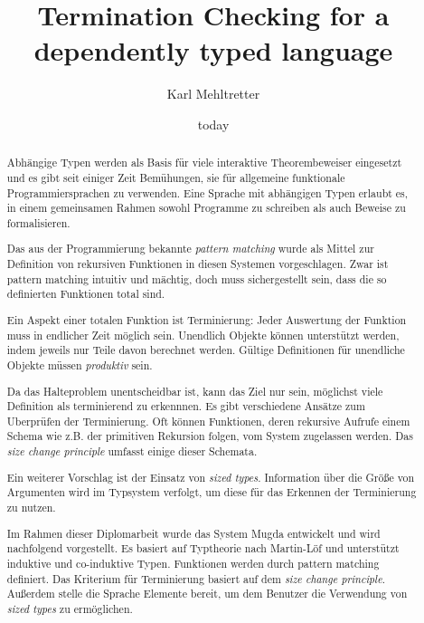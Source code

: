 \documentclass[a4paper,11pt]{report}
\theoremstyle{remark}
\newcommand{\mugda}{\textsf{Mugda }}
\begin{document}
\title{Termination Checking for a dependently typed language}
\author{Karl Mehltretter}
\date{today}
\renewcommand{\abstractname}{Abstrakt}
\begin{abstract}
Abh\"angige Typen werden als Basis f\"ur viele interaktive Theorembeweiser eingesetzt und es gibt seit einiger Zeit Bem\"uhungen, sie f\"ur allgemeine funktionale Programmiersprachen zu verwenden.
Eine Sprache mit abh\"angigen Typen erlaubt es, in einem gemeinsamen Rahmen sowohl Programme zu schreiben als auch Beweise zu formalisieren.

Das aus der Programmierung bekannte \emph{pattern matching} wurde als Mittel zur Definition von
rekursiven Funktionen in diesen Systemen vorgeschlagen.
Zwar ist pattern matching intuitiv und m\"achtig, doch muss sichergestellt sein, dass die so definierten Funktionen total sind.

Ein Aspekt einer totalen Funktion ist Terminierung: Jeder Auswertung der Funktion muss in endlicher Zeit m\"oglich sein.  Unendlich Objekte k\"onnen unterst\"utzt werden, indem jeweils nur Teile davon berechnet werden.
G\"ultige Definitionen f\"ur unendliche Objekte m\"ussen \emph{produktiv} sein.

Da das Halteproblem unentscheidbar ist, kann das Ziel nur sein, m\"oglichst viele Definition als terminierend zu erkennnen. Es gibt verschiedene Ans\"atze zum Uberpr\"ufen der Terminierung.
Oft k\"onnen Funktionen, deren rekursive Aufrufe einem Schema wie z.B. der primitiven Rekursion folgen,
 vom System zugelassen werden. Das \emph{size change principle} umfasst einige dieser Schemata. 

Ein weiterer Vorschlag ist der Einsatz von \emph{sized types}. Information \"uber die Gr\"o\ss e von Argumenten wird im Typsystem verfolgt, um diese f\"ur das Erkennen der Terminierung zu nutzen.   

Im Rahmen dieser Diplomarbeit wurde das System \mugda entwickelt und wird nachfolgend vorgestellt.
Es basiert auf Typtheorie nach Martin-L\"of und unterst\"utzt induktive und co-induktive Typen. Funktionen werden  durch pattern matching definiert.
Das Kriterium f\"ur Terminierung basiert auf dem \emph{size change principle}.
Au\ss erdem stelle die Sprache Elemente bereit, um dem Benutzer die Verwendung von \emph{sized types} zu erm\"oglichen.
\end{abstract}
\newpage
\end{document}
